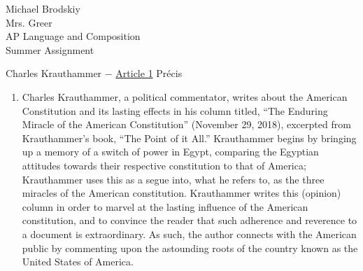 \documentclass[12pt]{article}
\begin{document}
Michael Brodskiy\\
Mrs. Greer\\
AP Language and Composition\\
Summer Assignment\\


\begin{center}
  Charles Krauthammer $-$ \href{https://www.washingtonpost.com/opinions/charles-krauthammer-the-enduring-miracle-of-the-american-constitution/2018/11/29/fb8879d2-f405-11e8-aeea-b85fd44449f5_story}{Article 1} Pr\'ecis
\end{center}


\setlength{\parindent}{0.5in}

\begin{justify}
\begin{enumerate}

  \item Charles Krauthammer, a political commentator, writes about the American Constitution and its lasting effects in his column titled, ``The Enduring Miracle of the American Constitution'' (November 29, 2018), excerpted from Krauthammer's book, ``The Point of it All.'' Krauthammer begins by bringing up a memory of a switch of power in Egypt, comparing the Egyptian attitudes towards their respective constitution to that of America; Krauthammer uses this as a segue into, what he refers to, as the three miracles of the American constitution. Krauthammer writes this (opinion) column in order to marvel at the lasting influence of the American constitution, and to convince the reader that such adherence and reverence to a document is extraordinary. As such, the author connects with the American public by commenting upon the astounding roots of the country known as the United States of America. 
\end{enumerate}
\newpage


\end{justify}
\end{document}
